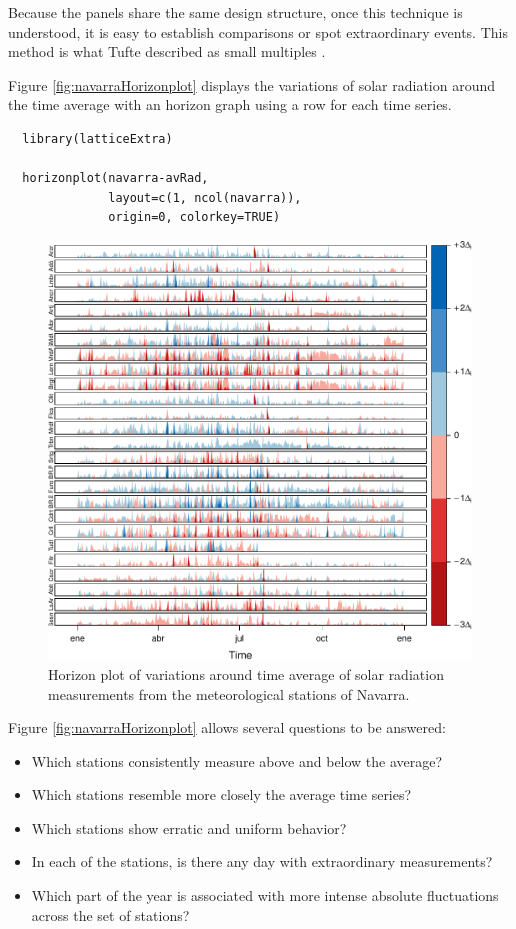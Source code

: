 \documentclass[smallroyalvopaper]{memoir}
\begin{document}
Because the panels share the same design structure, once this
technique is understood, it is easy to establish comparisons or spot
extraordinary events.  This method is what Tufte described as small
multiples \cite{Tufte1990}.

Figure \ref{fig:navarraHorizonplot} displays the variations of
solar radiation around the time average with an horizon graph
using a row for each time series.


\lstset{language=r,label= ,caption= ,captionpos=b,numbers=none}
\begin{lstlisting}
  library(latticeExtra)
  
  horizonplot(navarra-avRad,
              layout=c(1, ncol(navarra)),
              origin=0, colorkey=TRUE)
\end{lstlisting}

\begin{figure}[htbp]
\centering
\includegraphics[width=.9\linewidth]{figs/navarraHorizonplot.pdf}
\caption{\label{fig:orgdb19d16}
Horizon plot of variations around time average of solar radiation measurements from the meteorological stations of Navarra.}
\end{figure}

Figure \ref{fig:navarraHorizonplot} allows several questions to be
answered:
\begin{itemize}
\item Which stations consistently measure above and below the average?
\item Which stations resemble more closely the average time series?
\item Which stations show erratic and uniform behavior?
\item In each of the stations, is there any day with extraordinary measurements?
\item Which part of the year is associated with more intense
absolute fluctuations across the set of stations?
\end{itemize}
\end{document}
